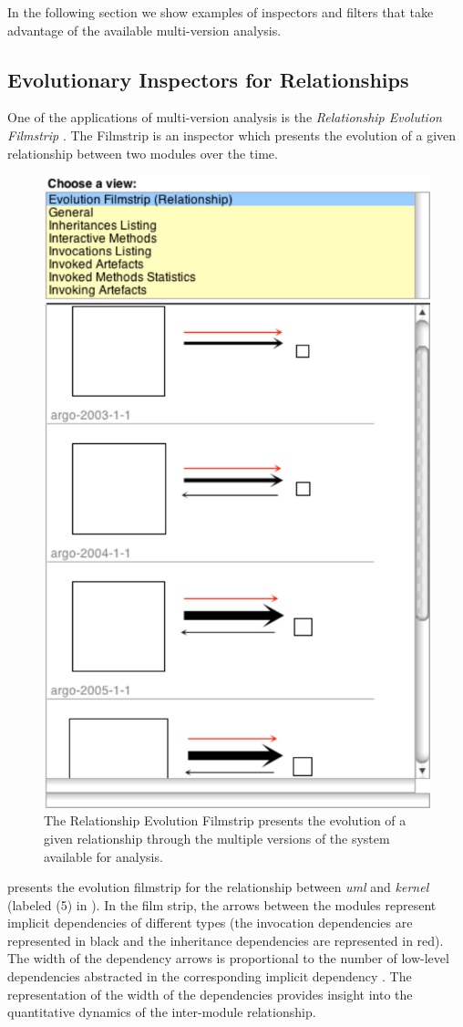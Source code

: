 \documentclass[preprint,12pt]{elsarticle}
\newcommand{\cd}[1]{{\em{#1}}}
\begin{document}
In the following section we show examples of inspectors and filters that take advantage of the available multi-version analysis. 


\newpage
\subsection {Evolutionary Inspectors for Relationships}


One of the applications of multi-version analysis is the {\em Relationship Evolution Filmstrip} \cite{lungu-relevo}. The Filmstrip is an inspector which presents the evolution of a given relationship between two modules over the time. 


\begin{figure}[ht!]
\begin{center}
\includegraphics[width=0.35\linewidth]{images/Filmstrip}
\caption{The Relationship Evolution Filmstrip presents the evolution of a given relationship through the multiple versions of the system available for analysis.}
\end{center}
\end{figure}

 presents the evolution filmstrip for the relationship between \cd{uml} and \cd{kernel} (labeled (5) in ). In the film strip, the arrows between the modules represent implicit dependencies of different types (the invocation dependencies are represented in black and the inheritance dependencies are represented in red). The width of the dependency arrows is proportional to the number of low-level dependencies abstracted in the corresponding implicit dependency \cite{lungu-relevo}. The representation of the width of the dependencies provides insight into the quantitative dynamics of the inter-module relationship.
\end{document}
